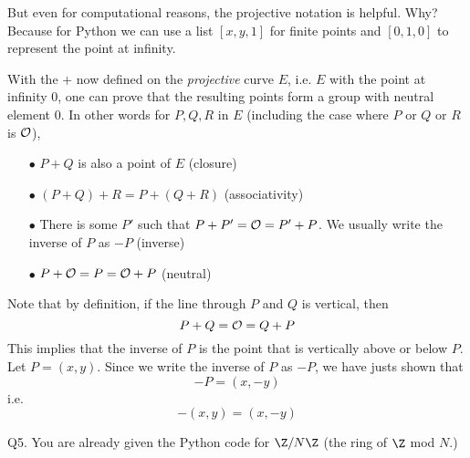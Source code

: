 \documentclass[a4paper,12pt]{article}
\begin{document}
But even for computational reasons, the projective notation is helpful.
Why? Because for Python we can use a list $[x,y,1]$ for finite points
and $[0,1,0]$ to represent the point at infinity.

With the + now defined on the {\it projective} curve $E$, i.e. $E$
with the point at infinity $0$, one can prove that
the resulting points form a group with neutral element $0$.
In other words for $P, Q, R$ in $E$ (including the case where $P$
or $Q$ or $R$ is ${\cal O}$),
\begin{enumerate}
\item[$\bullet$] $P + Q$ is also a point of $E$ (closure)
\item[$\bullet$] $(P + Q) + R = P + (Q + R)$ (associativity)
\item[$\bullet$] There is some $P'$ such that 
$P + P' = {\cal O} = P' + P$.
We usually write the inverse of $P$ as $-P$ (inverse)
\item[$\bullet$] $P + {\cal O} = P = {\cal O} + P$ (neutral)
\end{enumerate}

Note that by definition, if the line through $P$ and $Q$ is vertical,
then 
\[
P + Q = {\cal O} = Q + P
\]
This implies that the inverse of $P$ is the point that is vertically
above or below $P$. 
Let $P = (x,y)$. 
Since we write the inverse of $P$ as $-P$, we have justs shown that
\[
-P = (x, -y)
\]
i.e.
\[
-(x, y) = (x, -y)
\]

\newpage

\newpage

Q5. You are already given the Python code for $\Z/N\Z$ 
(the ring of $\Z$ mod $N$.)
\end{document}
